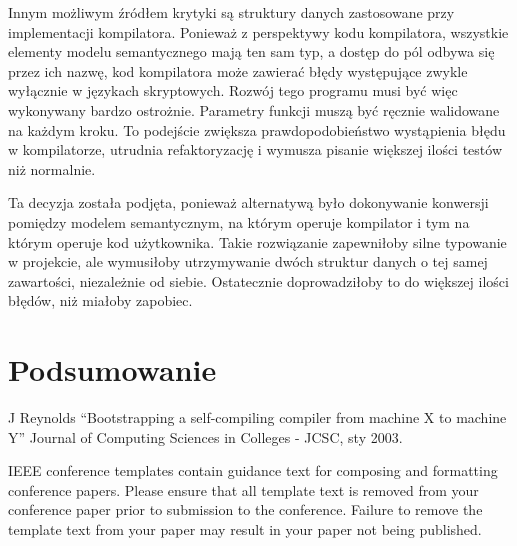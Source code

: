 \documentclass[conference]{IEEEtran}
\begin{document}
Innym możliwym źródłem krytyki są struktury danych zastosowane przy implementacji kompilatora.
Ponieważ z perspektywy kodu kompilatora, wszystkie elementy modelu semantycznego mają ten sam typ, a dostęp do pól odbywa się przez ich nazwę, kod kompilatora może zawierać błędy występujące zwykle wyłącznie w językach skryptowych.
Rozwój tego programu musi być więc wykonywany bardzo ostrożnie.
Parametry funkcji muszą być ręcznie walidowane na każdym kroku.
To podejście zwiększa prawdopodobieństwo wystąpienia błędu w kompilatorze, utrudnia refaktoryzację i wymusza pisanie większej ilości testów niż normalnie.

Ta decyzja została podjęta, ponieważ alternatywą było dokonywanie konwersji pomiędzy modelem semantycznym, na którym operuje kompilator i tym na którym operuje kod użytkownika.
Takie rozwiązanie zapewniłoby silne typowanie w projekcie, ale wymusiłoby utrzymywanie dwóch struktur danych o tej samej zawartości, niezależnie od siebie.
Ostatecznie doprowadziłoby to do większej ilości błędów, niż miałoby zapobiec.



\section{Podsumowanie}

\begin{thebibliography}{00}
     J Reynolds ``Bootstrapping a self-compiling compiler from machine X to machine Y'' Journal of Computing Sciences in Colleges - JCSC, sty 2003.
\end{thebibliography}
\vspace{12pt}
\color{red}
IEEE conference templates contain guidance text for composing and formatting conference papers. Please ensure that all template text is removed from your conference paper prior to submission to the conference. Failure to remove the template text from your paper may result in your paper not being published.
\end{document}
